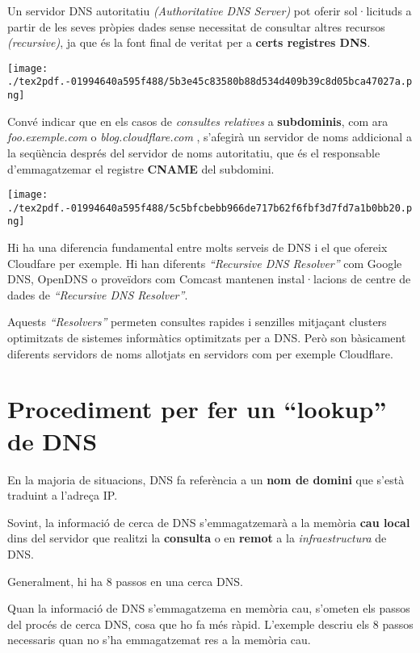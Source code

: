 \documentclass[]{article}
\begin{document}
Un servidor DNS autoritatiu \emph{(Authoritative DNS Server)} pot oferir
sol·licituds a partir de les seves pròpies dades sense necessitat de
consultar altres recursos \emph{(recursive)}, ja que és la font final de
veritat per a \textbf{certs registres DNS}.

\texttt{[image: ./tex2pdf.-01994640a595f488/5b3e45c83580b88d534d409b39c8d05bca47027a.png]}

Convé indicar que en els casos de \emph{consultes relatives} a
\textbf{subdominis}, com ara \emph{foo.exemple.com} o
\emph{blog.cloudflare.com} , s'afegirà un servidor de noms addicional a
la seqüència després del servidor de noms autoritatiu, que és el
responsable d'emmagatzemar el registre \textbf{CNAME} del subdomini.

\texttt{[image: ./tex2pdf.-01994640a595f488/5c5bfcbebb966de717b62f6fbf3d7fd7a1b0bb20.png]}

Hi ha una diferencia fundamental entre molts serveis de DNS i el que
ofereix Cloudfare per exemple. Hi han diferents \emph{``Recursive DNS
Resolver''} com Google DNS, OpenDNS o proveïdors com Comcast mantenen
instal·lacions de centre de dades de \emph{``Recursive DNS Resolver''}.

Aquests \emph{``Resolvers''} permeten consultes rapides i senzilles
mitjaçant clusters optimitzats de sistemes informàtics optimitzats per a
DNS. Però son bàsicament diferents servidors de noms allotjats en
servidors com per exemple Cloudflare.

\hypertarget{procediment-per-fer-un-lookup-de-dns}{%
\section{\texorpdfstring{\textbf{Procediment per fer un ``lookup'' de
DNS}}{Procediment per fer un ``lookup'' de DNS}}\label{procediment-per-fer-un-lookup-de-dns}}

En la majoria de situacions, DNS fa referència a un \textbf{nom de
domini} que s'està traduint a l'adreça IP.

Sovint, la informació de cerca de DNS s'emmagatzemarà a la memòria
\textbf{cau local} dins del servidor que realitzi la \textbf{consulta} o
en \textbf{remot} a la \emph{infraestructura} de DNS.

Generalment, hi ha 8 passos en una cerca DNS.

Quan la informació de DNS s'emmagatzema en memòria cau, s'ometen els
passos del procés de cerca DNS, cosa que ho fa més ràpid. L'exemple
descriu els 8 passos necessaris quan no s'ha emmagatzemat res a la
memòria cau.
\end{document}
